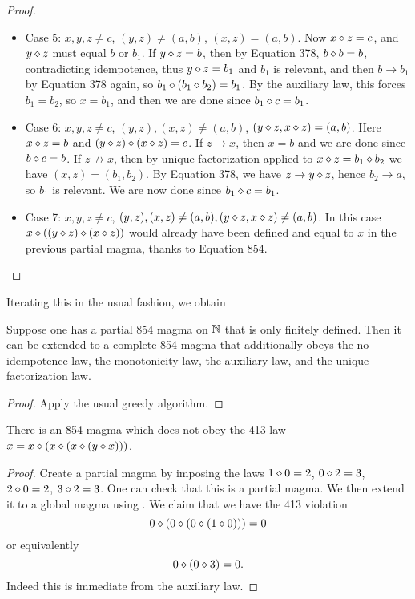 \begin{proof}
\begin{itemize}
  \item Case 5: $x,y,z \neq c$, $(y,z) \neq (a,b)$, $(x,z) = (a,b)$.  Now $x \diamond z = c$, and $y \diamond z$ must equal $b$ or $b_1$.  If $y \diamond z = b$, then by Equation 378, $b \diamond b = b$, contradicting idempotence, thus $y \diamond z = b_1$ and $b_1$ is relevant, and then $b \to b_1$ by Equation 378 again, so $b_1 \diamond (b_1 \diamond b_2) = b_1$.  By the auxiliary law, this forces $b_1 = b_2$, so $x = b_1$, and then we are done since $b_1 \diamond c = b_1$.
  \item Case 6: $x,y,z \neq c$, $(y,z), (x,z) \neq (a,b)$, $(y \diamond z, x \diamond z) = (a,b)$.  Here $x \diamond z = b$ and $(y \diamond z) \diamond (x \diamond z) = c$.  If $z \to x$, then $x=b$ and we are done since $b \diamond c = b$.  If $z \not \to x$, then by unique factorization applied to $x \diamond z = b_1 \diamond b_2$ we have $(x,z) = (b_1,b_2)$.  By Equation 378, we have $z \to y \diamond z$, hence $b_2 \to a$, so $b_1$ is relevant.  We are now done since $b_1 \diamond c = b_1$.
  \item Case 7: $x,y,z \neq c$, $(y,z), (x,z) \neq (a,b), (y \diamond z, x \diamond z) \neq (a,b)$.  In this case $x \diamond ((y \diamond z) \diamond (x \diamond z))$ would already have been defined and equal to $x$ in the previous partial magma, thanks to Equation 854.
\end{itemize}
\end{proof}

Iterating this in the usual fashion, we obtain

\begin{corollary}[854 extension]\label{extend-854}\leanok{}
Suppose one has a partial 854 magma on $\mathbb{N}$ that is only finitely defined.  Then it can be extended to a complete 854 magma that additionally obeys the no idempotence law, the monotonicity law, the auxiliary law, and the unique factorization law.
\end{corollary}

\begin{proof}  Apply the usual greedy algorithm.
\end{proof}

\begin{corollary}  There is an 854 magma which does not obey the 413 law $x = x \diamond (x \diamond (x \diamond (y \diamond x)))$.
\end{corollary}

\begin{proof} Create a partial magma by imposing the laws $1 \diamond 0 = 2$, $0 \diamond 2 = 3$, $2 \diamond 0 = 2$, $3 \diamond 2 = 3$.  One can check that this is a partial magma.  We then extend it to a global magma using .  We claim that we have the 413 violation
  $$ 0 \diamond (0 \diamond (0 \diamond (1 \diamond 0))) = 0$$
  or equivalently
  $$ 0 \diamond (0 \diamond 3) = 0.$$
Indeed this is immediate from the auxiliary law.
\end{proof}

